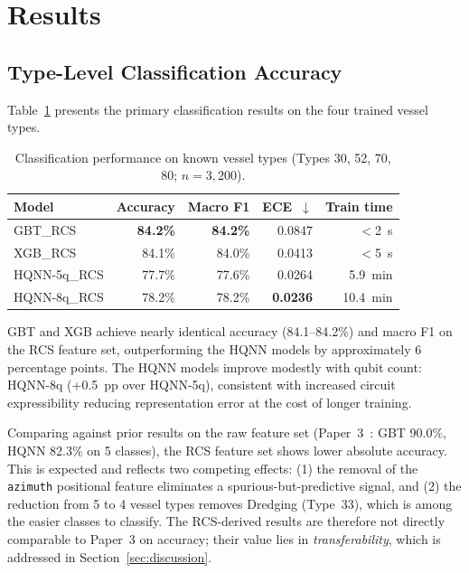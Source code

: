 \documentclass[journal]{IEEEtran}
\begin{document}
\section{Results}
\label{sec:results}

\subsection{Type-Level Classification Accuracy}
\label{sec:type_results}

Table~\ref{tab:main_results} presents the primary classification
results on the four trained vessel types.

\begin{table}[H]
\centering
\caption{Classification performance on known vessel types (Types 30, 52, 70, 80;
         $n = 3{,}200$).}
\label{tab:main_results}
\begin{tabular}{lrrrr}
\toprule
\textbf{Model} & \textbf{Accuracy} & \textbf{Macro F1} & \textbf{ECE~$\downarrow$} & \textbf{Train time} \\
\midrule
GBT\_RCS    & \textbf{84.2\%} & \textbf{84.2\%} & 0.0847 & $<$2~s \\
XGB\_RCS    & 84.1\%          & 84.0\%          & 0.0413 & $<$5~s \\
HQNN-5q\_RCS & 77.7\%         & 77.6\%          & 0.0264 & 5.9~min \\
HQNN-8q\_RCS & 78.2\%         & 78.2\%          & \textbf{0.0236} & 10.4~min \\
\bottomrule
\end{tabular}
\end{table}

GBT and XGB achieve nearly identical accuracy (84.1--84.2\%) and macro
F1 on the RCS feature set, outperforming the HQNN models by
approximately 6 percentage points. The HQNN models improve modestly
with qubit count: HQNN-8q (+0.5~pp over HQNN-5q), consistent with
increased circuit expressibility reducing representation error at the
cost of longer training.

Comparing against prior results on the raw feature set
(Paper~3~\cite{paper3qml}: GBT 90.0\%, HQNN 82.3\% on 5 classes), the
RCS feature set shows lower absolute accuracy. This is expected and
reflects two competing effects: (1) the removal of the \texttt{azimuth}
positional feature eliminates a spurious-but-predictive signal, and
(2) the reduction from 5 to 4 vessel types removes Dredging (Type~33),
which is among the easier classes to classify. The RCS-derived results
are therefore not directly comparable to Paper~3 on accuracy; their
value lies in \emph{transferability}, which is addressed in
Section~\ref{sec:discussion}.
\end{document}
